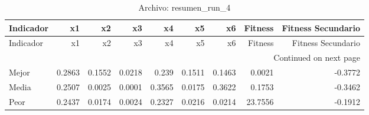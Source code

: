 \begin{longtable}{lrrrrrrrr}
\caption{Archivo: resumen\_run\_4}\label{tab:resumen_run_4} \\
\toprule
Indicador & x1 & x2 & x3 & x4 & x5 & x6 & Fitness & Fitness Secundario \\
\midrule
\endfirsthead
\toprule
Indicador & x1 & x2 & x3 & x4 & x5 & x6 & Fitness & Fitness Secundario \\
\midrule
\endhead
\midrule
\multicolumn{9}{r}{Continued on next page} \\
\midrule
\endfoot
\bottomrule
\endlastfoot
Mejor & 0.2863 & 0.1552 & 0.0218 & 0.239 & 0.1511 & 0.1463 & 0.0021 & -0.3772 \\
Media & 0.2507 & 0.0025 & 0.0001 & 0.3565 & 0.0175 & 0.3622 & 0.1753 & -0.3462 \\
Peor & 0.2437 & 0.0174 & 0.0024 & 0.2327 & 0.0216 & 0.0214 & 23.7556 & -0.1912 \\
\end{longtable}